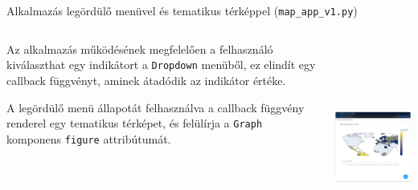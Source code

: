 \documentclass[english, aspectratio=169]{beamer}
\begin{document}
\begin{frame}[fragile]{Alkalmazás legördülő menüvel és tematikus térképpel (\texttt{map\_app\_v1.py})}
	\begin{columns}
		\begin{column}{.5\textwidth}
			Az alkalmazás működésének megfelelően a felhasználó kiválaszthat egy indikátort a \texttt{Dropdown} menüből, ez elindít egy callback függvényt, aminek átadódik az indikátor értéke.\par\smallskip
			A legördülő menü állapotát felhasználva a callback függvény renderel egy tematikus térképet, és felülírja a \texttt{Graph} komponens \texttt{figure} attribútumát.
		\end{column}
		\begin{column}{.5\textwidth}
			\begin{center}
				\includegraphics[width=7cm, height=7cm, keepaspectratio]{images/scatter_23.png}
			\end{center}
		\end{column}
	\end{columns}
\end{frame}
\end{document}
